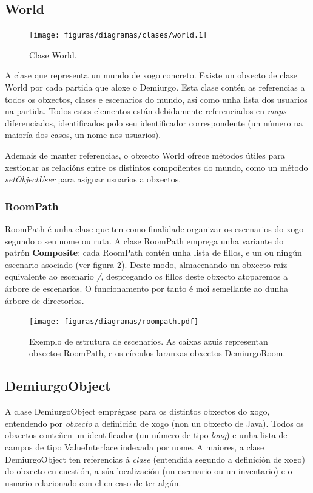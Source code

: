 \subsection{World}
\begin{figure}
\centerline{\texttt{[image: figuras/diagramas/clases/world.1]}}
\caption{Clase World.}
\label{fig:world}
\end{figure}
A clase que representa un mundo de xogo concreto. Existe un obxecto de clase
World por cada partida que aloxe o Demiurgo. Esta clase contén as referencias a
todos os obxectos, clases e escenarios do mundo, así como unha lista dos
usuarios na partida. Todos estes elementos están debidamente referenciados
en \textit{maps} diferenciados, identificados polo seu identificador
correspondente (un número na maioría dos casos, un nome nos usuarios).
\par
Ademais de manter referencias, o obxecto World ofrece métodos útiles para
xestionar as relacións entre os distintos compoñentes do mundo, como un método
\textit{setObjectUser} para asignar usuarios a obxectos.

\subsubsection{RoomPath}
RoomPath é unha clase que ten como finalidade organizar os escenarios do xogo
segundo o seu nome ou ruta. A clase RoomPath emprega unha variante do patrón
\textbf{Composite}: cada RoomPath contén unha lista de fillos, e un ou ningún
escenario asociado (ver figura \ref{fig:roompath}). Deste modo, almacenando un
obxecto raíz equivalente ao escenario \textit{/}, despregando os fillos deste
obxecto atoparemos a árbore de escenarios. O funcionamento por tanto é moi
semellante ao dunha árbore de directorios.
\begin{figure}
\centerline{\texttt{[image: figuras/diagramas/roompath.pdf]}}
\caption{Exemplo de estrutura de escenarios. As caixas azuis representan
obxectos RoomPath, e os círculos laranxas obxectos DemiurgoRoom.}
\label{fig:roompath}
\end{figure}

\subsection{DemiurgoObject}
A clase DemiurgoObject emprégase para os distintos obxectos do xogo, entendendo
por \textit{obxecto} a definición de xogo (non un obxecto de Java). Todos os
obxectos conteñen un identificador (un número de tipo \textit{long}) e unha
lista de campos de tipo ValueInterface indexada por nome. A maiores, a clase
DemiurgoObject ten referencias á \textit{clase} (entendida segundo a definición
de xogo) do obxecto en cuestión, a súa localización (un escenario ou un
inventario) e o usuario relacionado con el en caso de ter algún.

